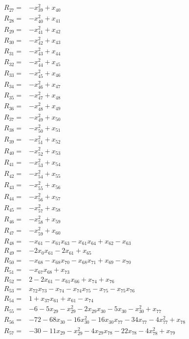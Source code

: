 \begin{align*}
R_{27}={}&-x_{39}^{2}+x_{40}\\[3pt]
R_{28}={}&-x_{40}^{2}+x_{41}\\[3pt]
R_{29}={}&-x_{41}^{2}+x_{42}\\[3pt]
R_{30}={}&-x_{42}^{2}+x_{43}\\[3pt]
R_{31}={}&-x_{43}^{2}+x_{44}\\[3pt]
R_{32}={}&-x_{44}^{2}+x_{45}\\[3pt]
R_{33}={}&-x_{45}^{2}+x_{46}\\[3pt]
R_{34}={}&-x_{46}^{2}+x_{47}\\[3pt]
R_{35}={}&-x_{47}^{2}+x_{48}\\[3pt]
R_{36}={}&-x_{48}^{2}+x_{49}\\[3pt]
R_{37}={}&-x_{49}^{2}+x_{50}\\[3pt]
R_{38}={}&-x_{50}^{2}+x_{51}\\[3pt]
R_{39}={}&-x_{51}^{2}+x_{52}\\[3pt]
R_{40}={}&-x_{52}^{2}+x_{53}\\[3pt]
R_{41}={}&-x_{53}^{2}+x_{54}\\[3pt]
R_{42}={}&-x_{54}^{2}+x_{55}\\[3pt]
R_{43}={}&-x_{55}^{2}+x_{56}\\[3pt]
R_{44}={}&-x_{56}^{2}+x_{57}\\[3pt]
R_{45}={}&-x_{57}^{2}+x_{58}\\[3pt]
R_{46}={}&-x_{58}^{2}+x_{59}\\[3pt]
R_{47}={}&-x_{59}^{2}+x_{60}\\[3pt]
R_{48}={}&-x_{61}-x_{61}x_{63}-x_{61}x_{64}+x_{62}-x_{63}\\[3pt]
R_{49}={}&-2x_{0}x_{61}-2x_{61}+x_{65}\\[3pt]
R_{50}={}&-x_{68}-x_{68}x_{70}-x_{68}x_{71}+x_{69}-x_{70}\\[3pt]
R_{51}={}&-x_{67}x_{68}+x_{73}\\[3pt]
R_{52}={}&2-2x_{61}-x_{61}x_{66}+x_{74}+x_{76}\\[3pt]
R_{53}={}&x_{72}x_{73}-x_{74}-x_{74}x_{75}-x_{75}-x_{75}x_{76}\\[3pt]
R_{54}={}&1+x_{37}x_{61}+x_{61}-x_{74}\\[3pt]
R_{55}={}&-6-5x_{29}-x_{29}^{2}-2x_{29}x_{30}-5x_{30}-x_{30}^{2}+x_{77}\\[3pt]
R_{56}={}&-72-68x_{30}-16x_{30}^{2}-16x_{30}x_{77}-34x_{77}-4x_{77}^{2}+x_{78}\\[3pt]
R_{57}={}&-30-11x_{29}-x_{29}^{2}-4x_{29}x_{78}-22x_{78}-4x_{78}^{2}+x_{79}\\[3pt]

\end{align*}
